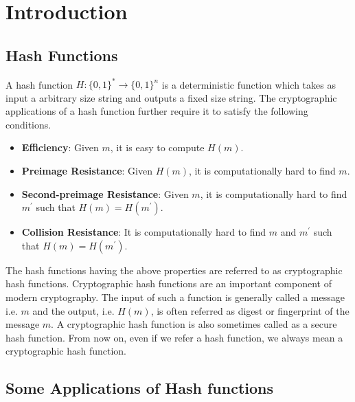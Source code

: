\chapter{Introduction}
\label{chap:intro}

\section{Hash Functions}

A hash function $H:\{0,1\}^* \rightarrow \{0,1\}^n $ is a deterministic
function which takes as input a arbitrary size string and outputs a fixed size string. The cryptographic applications of a hash function further require it to satisfy the following conditions.

\begin{itemize}\setlength\itemindent{10pt}
    \item {\bf Efficiency}: Given $m$, it is easy to compute $H(m)$.
    \item {\bf Preimage Resistance}: Given $H(m)$, it is computationally hard to find $m$.
    \item {\bf Second-preimage Resistance}: Given $m$, it is computationally hard to find $m^\prime$ such that $H(m)=H(m^\prime)$.
    \item {\bf Collision Resistance}: It is computationally hard to find $m$ and $m^\prime$ such that $H(m)=H(m^\prime)$.
\end{itemize}

The hash functions having the above properties are referred to as cryptographic hash functions. Cryptographic hash functions are an important component of modern cryptography. The input of such a function is generally called a message i.e. $m$ and the output, i.e. $H(m)$, is often referred as digest or fingerprint of the message $m$. 
A cryptographic hash function is also sometimes called as a secure hash function. From now on, even if we refer a hash function, we always mean a cryptographic hash function.

\section{Some Applications of Hash functions}

